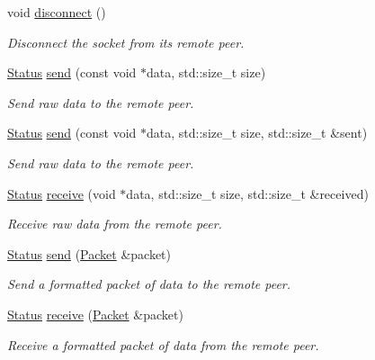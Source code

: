 \begin{DoxyCompactItemize}
void \hyperlink{classsf_1_1_tcp_socket_ac18f518a9be3d6be5e74b9404c253c1e}{disconnect} ()
\begin{DoxyCompactList}\small\item\em Disconnect the socket from its remote peer. \end{DoxyCompactList}\item 
\hyperlink{classsf_1_1_socket_a51bf0fd51057b98a10fbb866246176dc}{Status} \hyperlink{classsf_1_1_tcp_socket_affce26ab3bcc4f5b9269dad79db544c0}{send} (const void $\ast$data, std\+::size\+\_\+t size)
\begin{DoxyCompactList}\small\item\em Send raw data to the remote peer. \end{DoxyCompactList}\item 
\hyperlink{classsf_1_1_socket_a51bf0fd51057b98a10fbb866246176dc}{Status} \hyperlink{classsf_1_1_tcp_socket_a31f5b280126a96c6f3ad430f4cbcb54d}{send} (const void $\ast$data, std\+::size\+\_\+t size, std\+::size\+\_\+t \&sent)
\begin{DoxyCompactList}\small\item\em Send raw data to the remote peer. \end{DoxyCompactList}\item 
\hyperlink{classsf_1_1_socket_a51bf0fd51057b98a10fbb866246176dc}{Status} \hyperlink{classsf_1_1_tcp_socket_a90ce50811ea61d4f00efc62bb99ae1af}{receive} (void $\ast$data, std\+::size\+\_\+t size, std\+::size\+\_\+t \&received)
\begin{DoxyCompactList}\small\item\em Receive raw data from the remote peer. \end{DoxyCompactList}\item 
\hyperlink{classsf_1_1_socket_a51bf0fd51057b98a10fbb866246176dc}{Status} \hyperlink{classsf_1_1_tcp_socket_a0f8276e2b1c75aac4a7b0a707b250f44}{send} (\hyperlink{classsf_1_1_packet}{Packet} \&packet)
\begin{DoxyCompactList}\small\item\em Send a formatted packet of data to the remote peer. \end{DoxyCompactList}\item 
\hyperlink{classsf_1_1_socket_a51bf0fd51057b98a10fbb866246176dc}{Status} \hyperlink{classsf_1_1_tcp_socket_aa655352609bc9804f2baa020df3e7331}{receive} (\hyperlink{classsf_1_1_packet}{Packet} \&packet)
\begin{DoxyCompactList}\small\item\em Receive a formatted packet of data from the remote peer. \end{DoxyCompactList}\end{DoxyCompactItemize}
